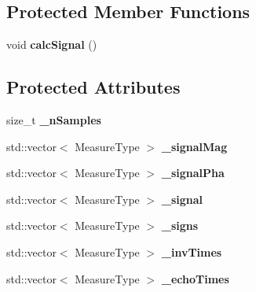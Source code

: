 \subsection*{Protected Member Functions}
\begin{DoxyCompactItemize}
\item 
void {\bfseries calc\+Signal} ()\hypertarget{class_ox_1_1_test_data_a014e56191a98df90450c0b6fa2abc45d}{}\label{class_ox_1_1_test_data_a014e56191a98df90450c0b6fa2abc45d}

\end{DoxyCompactItemize}
\subsection*{Protected Attributes}
\begin{DoxyCompactItemize}
\item 
size\+\_\+t {\bfseries \+\_\+n\+Samples}\hypertarget{class_ox_1_1_test_data_abcc5ee3036e60ac4e9529984b711b847}{}\label{class_ox_1_1_test_data_abcc5ee3036e60ac4e9529984b711b847}

\item 
std\+::vector$<$ Measure\+Type $>$ {\bfseries \+\_\+signal\+Mag}\hypertarget{class_ox_1_1_test_data_a180e0158dc204212fd4879690b2ea3ad}{}\label{class_ox_1_1_test_data_a180e0158dc204212fd4879690b2ea3ad}

\item 
std\+::vector$<$ Measure\+Type $>$ {\bfseries \+\_\+signal\+Pha}\hypertarget{class_ox_1_1_test_data_a5012bab7b7943d05b33151aae38efcc1}{}\label{class_ox_1_1_test_data_a5012bab7b7943d05b33151aae38efcc1}

\item 
std\+::vector$<$ Measure\+Type $>$ {\bfseries \+\_\+signal}\hypertarget{class_ox_1_1_test_data_a3d844b169fbdbfcb77d5ef0bf527f554}{}\label{class_ox_1_1_test_data_a3d844b169fbdbfcb77d5ef0bf527f554}

\item 
std\+::vector$<$ Measure\+Type $>$ {\bfseries \+\_\+signs}\hypertarget{class_ox_1_1_test_data_a9e22c4f291064b0c49f7c8007e77b40a}{}\label{class_ox_1_1_test_data_a9e22c4f291064b0c49f7c8007e77b40a}

\item 
std\+::vector$<$ Measure\+Type $>$ {\bfseries \+\_\+inv\+Times}\hypertarget{class_ox_1_1_test_data_a4a72325aa7d38c4cac1762a47b7eed1a}{}\label{class_ox_1_1_test_data_a4a72325aa7d38c4cac1762a47b7eed1a}

\item 
std\+::vector$<$ Measure\+Type $>$ {\bfseries \+\_\+echo\+Times}\hypertarget{class_ox_1_1_test_data_aaffd834afe5a5ceb48eb84a9268d0d68}{}\label{class_ox_1_1_test_data_aaffd834afe5a5ceb48eb84a9268d0d68}


\end{DoxyCompactItemize}
